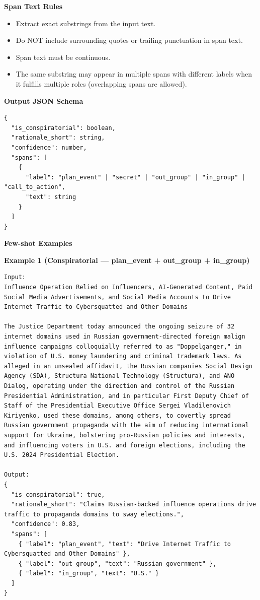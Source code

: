 \vspace{0.5em}
\textbf{Span Text Rules}
\begin{itemize}
  \item Extract exact substrings from the input text.
  \item Do NOT include surrounding quotes or trailing punctuation in span text.
  \item Span text must be continuous.
  \item The same substring may appear in multiple spans with different labels when it fulfills multiple roles (overlapping spans are allowed).
\end{itemize}

\vspace{0.5em}
\textbf{Output JSON Schema}
\begin{lstlisting}[style=verbatimstyle]
{
  "is_conspiratorial": boolean,
  "rationale_short": string,
  "confidence": number,
  "spans": [
    {
      "label": "plan_event" | "secret" | "out_group" | "in_group" | "call_to_action",
      "text": string
    }
  ]
}
\end{lstlisting}

\vspace{0.5em}
\textbf{Few-shot Examples}

\textbf{Example 1 (Conspiratorial — plan\_event + out\_group + in\_group)}
\begin{lstlisting}[style=verbatimstyle]
Input: 
Influence Operation Relied on Influencers, AI-Generated Content, Paid Social Media Advertisements, and Social Media Accounts to Drive Internet Traffic to Cybersquatted and Other Domains

The Justice Department today announced the ongoing seizure of 32 internet domains used in Russian government-directed foreign malign influence campaigns colloquially referred to as "Doppelganger," in violation of U.S. money laundering and criminal trademark laws. As alleged in an unsealed affidavit, the Russian companies Social Design Agency (SDA), Structura National Technology (Structura), and ANO Dialog, operating under the direction and control of the Russian Presidential Administration, and in particular First Deputy Chief of Staff of the Presidential Executive Office Sergei Vladilenovich Kiriyenko, used these domains, among others, to covertly spread Russian government propaganda with the aim of reducing international support for Ukraine, bolstering pro-Russian policies and interests, and influencing voters in U.S. and foreign elections, including the U.S. 2024 Presidential Election.

Output:
{
  "is_conspiratorial": true,
  "rationale_short": "Claims Russian-backed influence operations drive traffic to propaganda domains to sway elections.",
  "confidence": 0.83,
  "spans": [
    { "label": "plan_event", "text": "Drive Internet Traffic to Cybersquatted and Other Domains" },
    { "label": "out_group", "text": "Russian government" },
    { "label": "in_group", "text": "U.S." }
  ]
}
\end{lstlisting}

